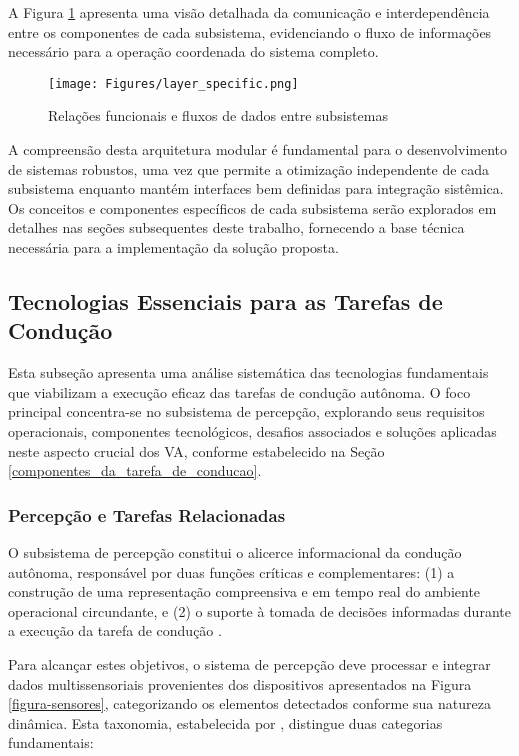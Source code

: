 A Figura \ref{layer_specific} apresenta uma visão detalhada da comunicação e interdependência entre os componentes de cada subsistema, evidenciando o fluxo de informações necessário para a operação coordenada do sistema completo.

\begin{figure}[H]
\centering
\texttt{[image: Figures/layer\_specific.png]}
\caption{Relações funcionais e fluxos de dados entre subsistemas \cite[p. ~4]{sensors-yet}}
\label{layer_specific}
\end{figure}

A compreensão desta arquitetura modular é fundamental para o desenvolvimento de sistemas robustos, uma vez que permite a otimização independente de cada subsistema enquanto mantém interfaces bem definidas para integração sistêmica. Os conceitos e componentes específicos de cada subsistema serão explorados em detalhes nas seções subsequentes deste trabalho, fornecendo a base técnica necessária para a implementação da solução proposta.

\subsection{Tecnologias Essenciais para as Tarefas de Condução} \label{Requisitos}

Esta subseção apresenta uma análise sistemática das tecnologias fundamentais que viabilizam a execução eficaz das tarefas de condução autônoma. O foco principal concentra-se no subsistema de percepção, explorando seus requisitos operacionais, componentes tecnológicos, desafios associados e soluções aplicadas neste aspecto crucial dos VA, conforme estabelecido na Seção \ref{componentes_da_tarefa_de_conducao}.

\subsubsection{Percepção e Tarefas Relacionadas}\label{percepcao}

O subsistema de percepção constitui o alicerce informacional da condução autônoma, responsável por duas funções críticas e complementares: (1) a construção de uma representação compreensiva e em tempo real do ambiente operacional circundante, e (2) o suporte à tomada de decisões informadas durante a execução da tarefa de condução \cite{zheng2023simultaneous}.

Para alcançar estes objetivos, o sistema de percepção deve processar e integrar dados multissensoriais provenientes dos dispositivos apresentados na Figura \ref{figura-sensores}, categorizando os elementos detectados conforme sua natureza dinâmica. Esta taxonomia, estabelecida por , distingue duas categorias fundamentais:

